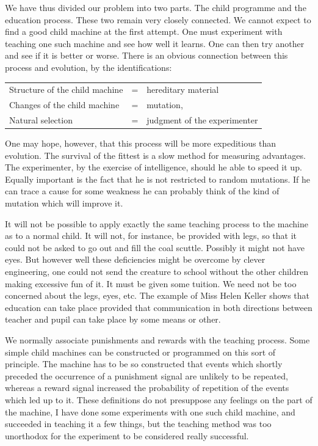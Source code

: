 \documentclass[10pt,twoside,openright]{memoir}
\begin{document}
We have thus divided our problem into two parts. The child programme and the education process. These two remain very closely connected. We cannot expect to find a good child machine at the first attempt. One must experiment with teaching one such machine and see how well it learns. One can then try another and see if it is better or worse. There is an obvious connection between this process and evolution, by the identifications:

\vskip 0.1in
{\footnotesize
\begin{tabular}{lcl}
Structure of the child machine &=& hereditary material \\
Changes of the child machine &=& mutation, \\
Natural selection &=& judgment of the experimenter \\
\end{tabular}}
\vskip 0.1in

One may hope, however, that this process will be more expeditious than evolution. The survival of the fittest is a slow method for measuring advantages. The experimenter, by the exercise of intelligence, should he able to speed it up. Equally important is the fact that he is not restricted to random mutations. If he can trace a cause for some weakness he can probably think of the kind of mutation which will improve it.

It will not be possible to apply exactly the same teaching process to the machine as to a normal child. It will not, for instance, be provided with legs, so that it could not be asked to go out and fill the coal scuttle. Possibly it might not have eyes. But however well these deficiencies might be overcome by clever engineering, one could not send the creature to school without the other children making excessive fun of it. It must be given some tuition. We need not be too concerned about the legs, eyes, etc. The example of Miss Helen Keller shows that education can take place provided that communication in both directions between teacher and pupil can take place by some means or other.

We normally associate punishments and rewards with the teaching process. Some simple child machines can be constructed or programmed on this sort of principle. The machine has to be so constructed that events which shortly preceded the occurrence of a punishment signal are unlikely to be repeated, whereas a reward signal increased the probability of repetition of the events which led up to it. These definitions do not presuppose any feelings on the part of the machine, I have done some experiments with one such child machine, and succeeded in teaching it a few things, but the teaching method was too unorthodox for the experiment to be considered really successful.
\end{document}

